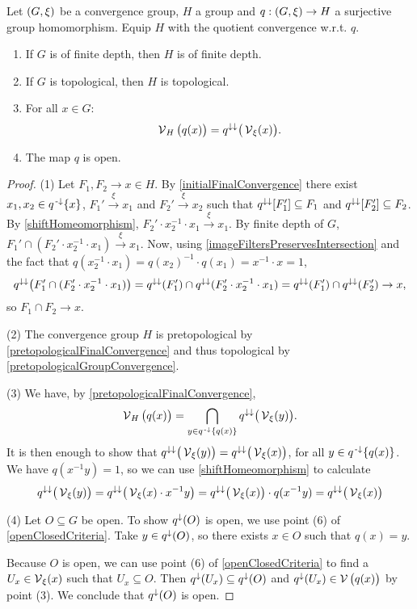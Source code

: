 \begin{proposition} \label{groupHomomorphismQuotient}
Let $\left( G, \xi \right)$ be a convergence group, $H$ a group and $q: \left( G, \xi \right) \to H$ a surjective group homomorphism. Equip $H$ with the quotient convergence w.r.t. $q$.
\begin{enumerate}
\item If $G$ is of finite depth, then $H$ is of finite depth.
\item If $G$ is topological, then $H$ is topological.
\item For all $x\in G$:
\[ \operatorname{\mathcal{V}}_H\big(q(x)\big) = q^{\downarrow\downarrow}\big(\operatorname{\mathcal{V}}_\xi(x)\big). \]
\item The map $q$ is open.
\end{enumerate}
\end{proposition}
\begin{proof}
(1) Let $F_1, F_2 \to x \in H$. By \ref{initialFinalConvergence} there exist $x_1, x_2\in q^{{\text{\hspace{0.15em}-}\downarrow}}\{x\}$, $F_1' \overset{\xi}{\longrightarrow} x_1$ and $F_2' \overset{\xi}{\longrightarrow} x_2$ such that $q^{\downarrow\downarrow}[F'_1] \subseteq F_1$ and $q^{\downarrow\downarrow}[F'_2] \subseteq F_2$. By \ref{shiftHomeomorphism}, $F_2'\cdot x_2^{-1}\cdot x_1 \overset{\xi}{\longrightarrow} x_1$. By finite depth of $G$, $F_1'\cap (F_2'\cdot x_2^{-1}\cdot x_1) \overset{\xi}{\longrightarrow} x_1$. Now, using \ref{imageFiltersPreservesIntersection} and the fact that $q(x_2^{-1}\cdot x_1) = q(x_2)^{-1}\cdot q(x_1) = x^{-1}\cdot x = 1$,
\[ q^{\downarrow\downarrow}\big(F_1'\cap (F_2'\cdot x_2^{-1}\cdot x_1)\big) = q^{\downarrow\downarrow}(F_1')\cap q^{\downarrow\downarrow}(F_2'\cdot x_2^{-1}\cdot x_1) = q^{\downarrow\downarrow}(F_1')\cap q^{\downarrow\downarrow}(F_2') \to x, \]
so $F_1\cap F_2 \to x$.

(2) The convergence group $H$ is pretopological by \ref{pretopologicalFinalConvergence} and thus topological by \ref{pretopologicalGroupConvergence}.

(3) We have, by \ref{pretopologicalFinalConvergence},
\[ \operatorname{\mathcal{V}}_H\big(q(x)\big) = \bigcap_{y\in q^{{\text{\hspace{0.15em}-}\downarrow}}\{q(x)\}}q^{\downarrow\downarrow}\big(\operatorname{\mathcal{V}}_\xi(y)\big). \]
It is then enough to show that $q^{\downarrow\downarrow}\big(\operatorname{\mathcal{V}}_\xi(y)\big) = q^{\downarrow\downarrow}\big(\operatorname{\mathcal{V}}_\xi(x)\big)$, for all $y\in q^{{\text{\hspace{0.15em}-}\downarrow}}\{q(x)\}$. We have $q(x^{-1}y) = 1$, so we can use \ref{shiftHomeomorphism} to calculate
\[ q^{\downarrow\downarrow}\big(\operatorname{\mathcal{V}}_\xi(y)\big) = q^{\downarrow\downarrow}\big(\operatorname{\mathcal{V}}_\xi(x)\cdot x^{-1}y\big) = q^{\downarrow\downarrow}\big(\operatorname{\mathcal{V}}_\xi(x)\big)\cdot q(x^{-1}y) = q^{\downarrow\downarrow}\big(\operatorname{\mathcal{V}}_\xi(x)\big) \]

(4) Let $O\subseteq G$ be open. To show $q^\downarrow(O)$ is open, we use point (6) of \ref{openClosedCriteria}. Take $y\in q^{\downarrow}(O)$, so there exists $x\in O$ such that $q(x) = y$.

Because $O$ is open, we can use point (6) of \ref{openClosedCriteria} to find a $U_x\in \operatorname{\mathcal{V}}_\xi(x)$ such that $U_x \subseteq O$. Then $q^{\downarrow}(U_x) \subseteq q^\downarrow(O)$ and $q^{\downarrow}(U_x)\in \operatorname{\mathcal{V}}\big(q(x)\big)$ by point (3). We conclude that $q^{\downarrow}(O)$ is open.
\end{proof}

